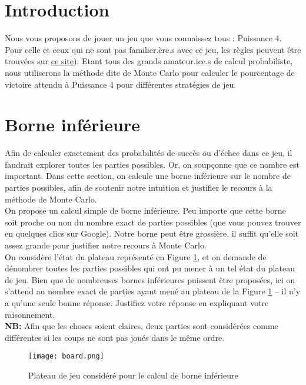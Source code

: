 \documentclass[11pt,answers]{exam}
\begin{document}
\section*{Introduction}

Nous vous proposons de jouer un jeu que vous connaissez tous : Puissance 4. Pour celle et ceux qui ne sont pas familier.ère.s avec ce jeu, les règles peuvent être trouvées sur \href{https://www.regles-de-jeux.com/regle-du-puissance-4/}{ce site}). Etant tous des grands amateur.ice.s de calcul probabiliste, nous utiliserons la méthode dite de Monte Carlo pour calculer le pourcentage de victoire attendu à Puissance 4 pour différentes stratégies de jeu. 



\bigskip


\section{Borne inférieure} \label{sec:borne_inf}

Afin de calculer exactement des probabilités de succès ou d'échec dans ce jeu, il faudrait explorer toutes les parties possibles. Or, on soupçonne que ce nombre est important. Dans cette section, on calcule une borne inférieure sur le nombre de parties possibles, afin de soutenir notre intuition et justifier le recours à la méthode de Monte Carlo.\\

On propose un calcul simple de borne inférieure. Peu importe que cette borne soit proche ou non du nombre exact de parties possibles (que vous pouvez trouver en quelques clics sur Google). Notre borne peut être grossière, il suffit qu'elle soit assez grande pour justifier notre recours à Monte Carlo.\\

On considère l'état du plateau représenté en Figure \ref{fig:bound}, et on demande de dénombrer toutes les parties possibles qui ont pu mener à un tel état du plateau de jeu. Bien que de nombreuses bornes inférieures puissent être proposées, ici on s'attend au nombre exact de parties ayant mené au plateau de la Figure \ref{fig:bound} -- il n'y a qu'une seule bonne réponse. Justifiez votre réponse en expliquant votre raisonnement.\\

\textbf{NB:} Afin que les choses soient claires, deux parties sont considérées comme différentes si les coups ne sont pas joués dans le même ordre.

\begin{figure}[!h]
	\centering
	\texttt{[image: board.png]}
 	\caption{Plateau de jeu considéré pour le calcul de borne inférieure}
	\label{fig:bound}
\end{figure}
\end{document}
